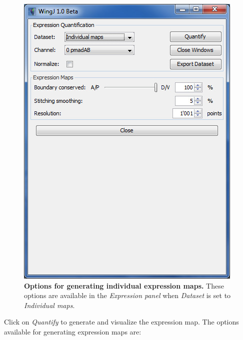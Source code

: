 \begin{figure}[!h]
\centering
\includegraphics[scale=0.7]{images/expression_panel_2.jpg}
\caption{\textbf{Options for generating individual expression maps.} These options are available in the \textit{Expression panel} when \textit{Dataset} is set to \textit{Individual maps}.}
\label{fig:wingj_expression_maps_circular_interface}
\end{figure}


Click on \textit{Quantify} to generate and visualize the expression map. The options available for generating expression maps are:

